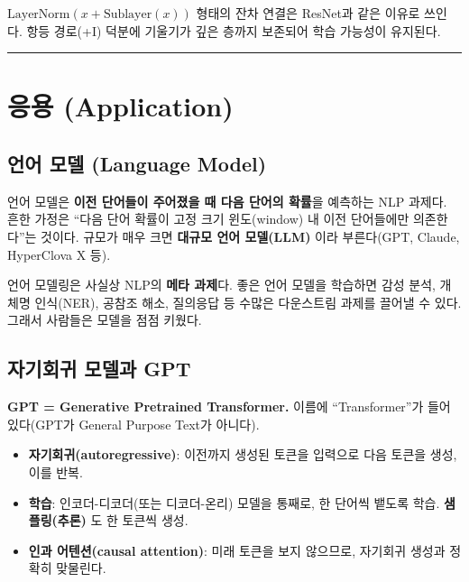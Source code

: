 \documentclass[
  korean,
]{article}
\providecommand{\tightlist}{%
  \setlength{\itemsep}{0pt}\setlength{\parskip}{0pt}}
\begin{document}
\begin{tcolorbox}[enhanced jigsaw, arc=.35mm, bottomrule=.15mm, bottomtitle=1mm, breakable, colback=white, colbacktitle=quarto-callout-note-color!10!white, colframe=quarto-callout-note-color-frame, coltitle=black, left=2mm, leftrule=.75mm, opacityback=0, opacitybacktitle=0.6, rightrule=.15mm, title=\textcolor{quarto-callout-note-color}{\faInfo}\hspace{0.5em}{Add \& Norm --- 왜 잔차 연결인가}, titlerule=0mm, toprule=.15mm, toptitle=1mm]

\(\text{LayerNorm}(x + \text{Sublayer}(x))\) 형태의 잔차 연결은 ResNet과
같은 이유로 쓰인다. 항등 경로(+I) 덕분에 기울기가 깊은 층까지 보존되어
학습 가능성이 유지된다.

\end{tcolorbox}

\begin{center}\rule{0.5\linewidth}{0.5pt}\end{center}

\section{응용 (Application)}\label{sec-application}

\subsection{언어 모델 (Language
Model)}\label{uxc5b8uxc5b4-uxbaa8uxb378-language-model}

언어 모델은 \textbf{이전 단어들이 주어졌을 때 다음 단어의 확률}을
예측하는 NLP 과제다. 흔한 가정은 ``다음 단어 확률이 고정 크기
윈도(window) 내 이전 단어들에만 의존한다''는 것이다. 규모가 매우 크면
\textbf{대규모 언어 모델(LLM)} 이라 부른다(GPT, Claude, HyperClova X
등).

언어 모델링은 사실상 NLP의 \textbf{메타 과제}다. 좋은 언어 모델을
학습하면 감성 분석, 개체명 인식(NER), 공참조 해소, 질의응답 등 수많은
다운스트림 과제를 끌어낼 수 있다. 그래서 사람들은 모델을 점점 키웠다.

\subsection{자기회귀 모델과
GPT}\label{uxc790uxae30uxd68cuxadc0-uxbaa8uxb378uxacfc-gpt}

\textbf{GPT = Generative Pretrained Transformer.} 이름에
``Transformer''가 들어 있다(GPT가 General Purpose Text가 아니다).

\begin{itemize}
\tightlist
\item
  \textbf{자기회귀(autoregressive)}: 이전까지 생성된 토큰을 입력으로
  다음 토큰을 생성, 이를 반복.
\item
  \textbf{학습}: 인코더-디코더(또는 디코더-온리) 모델을 통째로, 한
  단어씩 뱉도록 학습. \textbf{샘플링(추론)} 도 한 토큰씩 생성.
\item
  \textbf{인과 어텐션(causal attention)}: 미래 토큰을 보지 않으므로,
  자기회귀 생성과 정확히 맞물린다.
\end{itemize}
\end{document}
